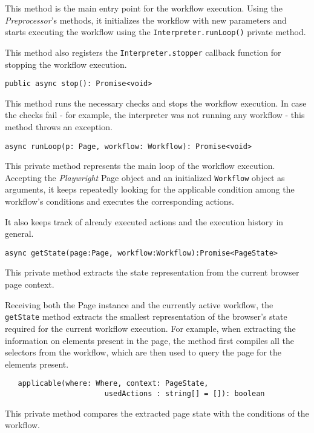 \smallskip

This method is the main entry point for the workflow execution.
Using the \textit{Preprocessor}'s methods, it initializes the workflow with new parameters and starts executing the workflow using the \texttt{Interpreter.runLoop()} private method.

This method also registers the \texttt{Interpreter.stopper} callback function for stopping the workflow execution.

\emptyline
\verb|public async stop(): Promise<void>|

\smallskip

This method runs the necessary checks and stops the workflow execution.
In case the checks fail - for example, the interpreter was not running any workflow - this method throws an exception. 

\emptyline
\verb|async runLoop(p: Page, workflow: Workflow): Promise<void>|

\smallskip

This private method represents the main loop of the workflow execution.
Accepting the \textit{Playwright} Page object and an initialized \texttt{Workflow} object as arguments,
it keeps repeatedly looking for the applicable condition among the workflow's conditions and executes the corresponding actions.

It also keeps track of already executed actions and the execution history in general.

\emptyline
\verb|async getState(page:Page, workflow:Workflow):Promise<PageState>|

\smallskip

This private method extracts the state representation from the current browser page context.

Receiving both the Page instance and the currently active workflow, the \texttt{getState} method extracts the smallest representation of the browser's state required 
for the current workflow execution. For example, when extracting the information on elements present in the page, the method first compiles all the selectors from the workflow,
which are then used to query the page for the elements present.

\emptyline
\begin{verbatim}   applicable(where: Where, context: PageState, 
                       usedActions : string[] = []): boolean \end{verbatim}

This private method compares the extracted page state with the conditions of the workflow.

